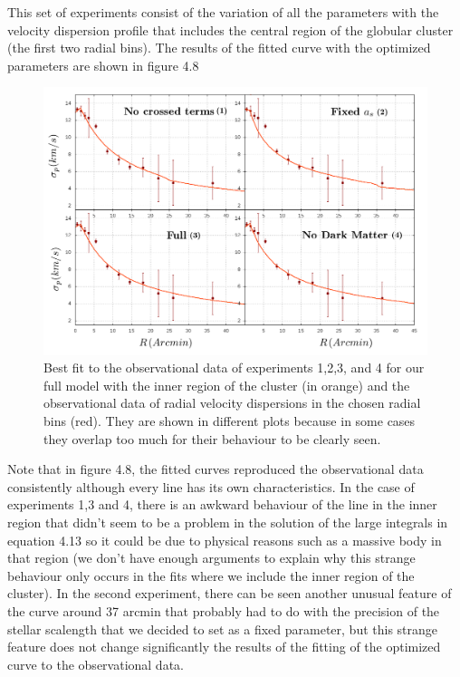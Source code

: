 This set of experiments consist of the variation of all the parameters with the velocity dispersion profile that includes the central region of the globular cluster (the first two radial bins). The results of the fitted curve with the optimized parameters are shown in figure 4.8

\begin{figure}[]
\centering
\includegraphics[width=15cm]{images/all_params_refinado_12.png}
\caption[Best fit of the full model with the inner region]{Best fit to the observational data of experiments 1,2,3, and 4 for our full model with the inner region of the cluster (in orange) and the observational data of radial velocity dispersions in the chosen radial bins (red). They are shown in different plots because in some cases they overlap too much for their behaviour to be clearly seen.}

\end{figure}

Note that in figure 4.8, the fitted curves reproduced the observational data consistently although every line has its own characteristics. In the case of experiments 1,3 and 4, there is an awkward behaviour of the line in the inner region that didn't seem to be a problem in the solution of the large integrals in equation 4.13 so it could be due to physical reasons such as a massive body in that region (we don't have enough arguments to explain why this strange behaviour only occurs in the fits where we include the inner region of the cluster). In the second experiment, there can be seen another unusual feature of the curve around 37 arcmin that probably had to do with the precision of the stellar scalength that we decided to set as a fixed parameter, but this strange feature does not change significantly the results of the fitting of the optimized curve to the observational data. 

